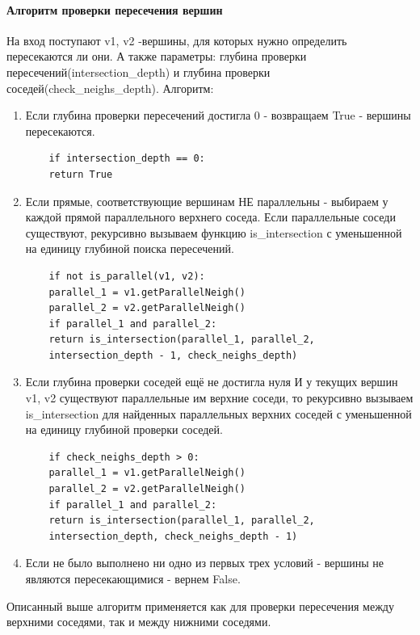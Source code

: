 \paragraph{Алгоритм проверки пересечения вершин}
\label{intersection}
На вход поступают v1, v2 -вершины, для которых нужно определить пересекаются ли они.
А также параметры: глубина проверки пересечений(intersection\_depth) и глубина проверки соседей(check\_neighs\_depth).
\newline
Алгоритм:
\begin{enumerate}
	\item Если глубина проверки пересечений достигла 0 - возвращаем True - вершины пересекаются.
	\begin{lstlisting}
	if intersection_depth == 0:
	return True
	\end{lstlisting}
	\item Если прямые, соответствующие вершинам НЕ параллельны - выбираем у каждой прямой параллельного верхнего соседа. Если параллельные соседи существуют, рекурсивно вызываем функцию is\_intersection с уменьшенной на единицу глубиной поиска пересечений.
	\begin{lstlisting}
	if not is_parallel(v1, v2):
	parallel_1 = v1.getParallelNeigh()
	parallel_2 = v2.getParallelNeigh()
	if parallel_1 and parallel_2:
	return is_intersection(parallel_1, parallel_2,
	intersection_depth - 1, check_neighs_depth)
	\end{lstlisting}
	\item Если глубина проверки соседей ещё не достигла нуля И у текущих вершин v1, v2 существуют параллельные им верхние соседи, то рекурсивно вызываем is\_intersection для найденных параллельных верхних соседей с уменьшенной на единицу глубиной проверки соседей.
	\begin{lstlisting}
	if check_neighs_depth > 0:
	parallel_1 = v1.getParallelNeigh()
	parallel_2 = v2.getParallelNeigh()
	if parallel_1 and parallel_2:
	return is_intersection(parallel_1, parallel_2,
	intersection_depth, check_neighs_depth - 1)
	\end{lstlisting}
	\item Если не было выполнено ни одно из первых трех условий - вершины не являются пересекающимися - вернем False.
\end{enumerate}
Описанный выше алгоритм применяется как для проверки пересечения между верхними соседями, так и между нижними соседями. 

